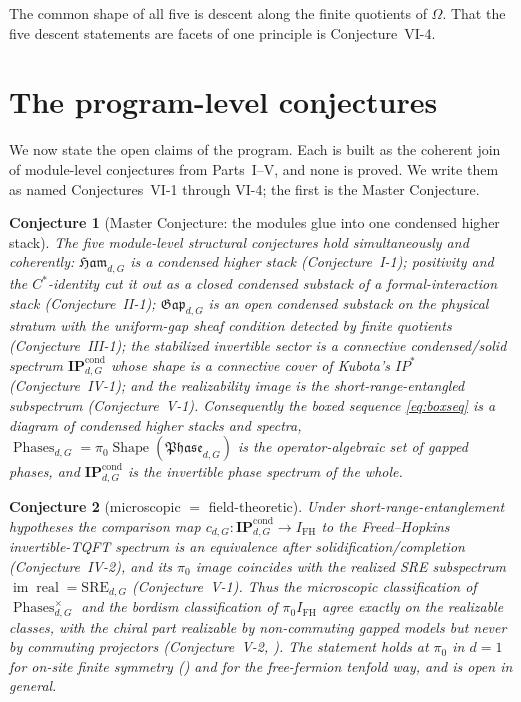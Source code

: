 \documentclass[12pt]{article}
\newcommand{\Shape}{\operatorname{Shape}}      %
\newcommand{\Ham}{\mathfrak{Ham}}              %
\newcommand{\Gap}{\mathfrak{Gap}}              %
\newcommand{\Phase}{\mathfrak{Phase}}          %
\newcommand{\Phases}{\operatorname{Phases}}    %
\newcommand{\IPcond}{\mathbf{IP}^{\mathrm{cond}}}  %
\newcommand{\dis}{\Omega}                       %
\newcommand{\SRE}{\mathrm{SRE}}
\newcommand{\IFH}{I_{\mathrm{FH}}}             %
\newcommand{\real}{\operatorname{real}}        %
\newcommand{\im}{\operatorname{im}}
\theoremstyle{plain}
\newtheorem{progconj}{Conjecture}
\theoremstyle{definition}
\theoremstyle{remark}
\begin{document}
The common shape of all five is descent along the finite quotients of $\dis$. That the
five descent statements are facets of one principle is Conjecture~VI-4.

\section{The program-level conjectures}
\label{sec:conjectures}

We now state the open claims of the program. Each is built as the coherent join of
module-level conjectures from Parts~I--V, and none is proved. We write them as named
Conjectures~VI-1 through VI-4; the first is the Master Conjecture.

\begin{progconj}[Master Conjecture: the modules glue into one condensed higher stack]
\label{conj:VI1}
The five module-level structural conjectures hold simultaneously and coherently:
$\Ham_{d,G}$ is a condensed higher stack (Conjecture~I-1); positivity and the
$C^\ast$-identity cut it out as a closed condensed substack of a formal-interaction stack
(Conjecture~II-1); $\Gap_{d,G}$ is an open condensed substack on the physical stratum with
the uniform-gap sheaf condition detected by finite quotients (Conjecture~III-1); the
stabilized invertible sector is a connective condensed/solid spectrum $\IPcond_{d,G}$
whose shape is a connective cover of Kubota's $\mathit{IP}^\ast$ (Conjecture~IV-1); and
the realizability image is the short-range-entangled subspectrum (Conjecture~V-1).
Consequently the boxed sequence \eqref{eq:boxseq} is a diagram of condensed higher stacks
and spectra, $\Phases_{d,G}=\pi_0\Shape(\Phase_{d,G})$ is the operator-algebraic set of
gapped phases, and $\IPcond_{d,G}$ is the invertible phase spectrum of the whole.
\end{progconj}

\begin{progconj}[microscopic $=$ field-theoretic]
\label{conj:VI2}
Under short-range-entanglement hypotheses the comparison map
$c_{d,G}:\IPcond_{d,G}\to\IFH$ to the Freed--Hopkins invertible-TQFT spectrum is an
equivalence after solidification/completion (Conjecture~IV-2), and its $\pi_0$ image
coincides with the realized SRE subspectrum $\im\real=\SRE_{d,G}$ (Conjecture~V-1). Thus
the microscopic classification of $\Phases_{d,G}^\times$ and the bordism classification of
$\pi_0\IFH$ agree exactly on the realizable classes, with the chiral part realizable by
non-commuting gapped models but never by commuting projectors (Conjecture~V-2,
). The statement holds at $\pi_0$ in $d=1$ for on-site finite symmetry
() and for the free-fermion tenfold way, and is open in general.
\end{progconj}
\end{document}
